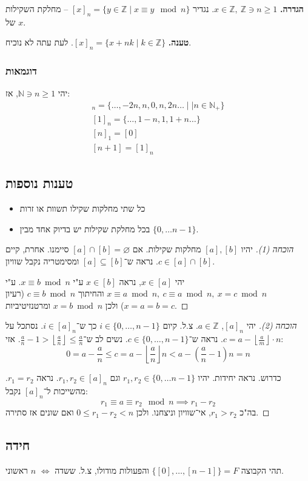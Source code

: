 \documentclass[]{article}
\newcommand\N     {\mathbb{N}}
\newcommand\Z     {\mathbb{Z}}
\newcommand\rf    {\right\rfloor}
\newcommand\lf    {\left\lfloor}
\newcommand\cl [1]    {\left ( #1 \right )}
\begin{document}
	\textbf{הגדרה. }$x \in \Z, \ \Z \ni n \ge 1$. נגדיר $[x]_n = \{y \in \Z \mid x \equiv y \mod n\}$ -- מחלקת השקילות של $x$. 
	
	\textbf{טענה. }$[x]_n = \{x + nk \mid k \in \Z\}$. לעת עתה לא נוכיח. 
	
	\subsubsection{דוגמאות}
	יהי $\N\ni n \ge 1$, אז: 
	\begin{gather}
		[0]_n = \{\dots, -2n, n, 0, n, 2n \dots \mid \mid n \in \N_+\} \\
		[1]_n = \{\dots, 1 - n, 1, 1 + n \dots \} \\
		[n]_1 = [0] \\
		[n + 1] = [1]_n
	\end{gather}
	
	\subsection{טענות נוספות}
	\begin{itemize}
		\item כל שתי מחלקות שקילו תשוות או זרות
		\item בכל מחלקת שקילות יש בדיוק אחד מבין $\{0, \dots n - 1\}$. 
	\end{itemize}
	
	\begin{proof}[הוכחה (1)]
		יהיו $[a], [b]$ מחלקות שקילות. אם $[a] \cap [b] = \varnothing$ סיימנו. אחרת, קיים $c \in [a] \cap [b]$. נראה ש־$[a] \subseteq [b]$ ומסימטריה נקבל שוויון. 
		
		יהי $x \in [a]$, נראה $x \in [b]$ ע"י $x \equiv b \bmod n$. ע"י $x \equiv a \bmod n, \ c \equiv a \bmod n, \ x = c \bmod n$ והחיתוך $c \equiv b \bmod n$ (רעיון $x = a = b = c$) ולכן $x =b \bmod n$ ומרטנזיטיביות. 
	\end{proof}
	\begin{proof}[הוכחה (2)]
		יהי $[a]_n$, $a \in \Z$. צ.ל. קיום $i \in \{0, \dots, n - 1\}$ כך ש־$i \in [a]_n$. נסתכל על $c = a - \lf \frac{a}{m}\rf \cdot n$. נראה ש־$c \in \{0, \dots, n - 1\}$. נשים לב ש־$\frac{a}{n} -1 > \lf \frac{a}{n}\rf \le \frac{a}{n}$. אזי: 
		\[ 0 = a - \frac{a}{n} \le c = a - \lf \frac{a}{n} \rf n< a - \cl{\frac{a}{n} - 1}n  = n \]

כדרוש. נראה יחידות. יהיו $r_1, r_2 \in \{0, \dots n - 1\}$ וגם $r_1, r_2 \in [a]_n$. נראה $r_1 = r_2$. מהשייכות ל־$[a]_n$ נקבל: 
\[ r_1 \equiv a \equiv r_2 \mod n \implies r_1 - r_2 \]
בה"כ $r_1 > r_2$, אי־שוויון וניצחנו. ולכן $0 \le r_1 - r_2 < n$ ואם שונים אז סתירה. 
	\end{proof}
	
	\subsection{חידה}
	תהי הקבוצה $\{[0], \dots, [n-1]\} = F$ והפעולות מודולו, צ.ל. ששדה $\iff$ $n$ ראשוני. 
	
\end{document}
